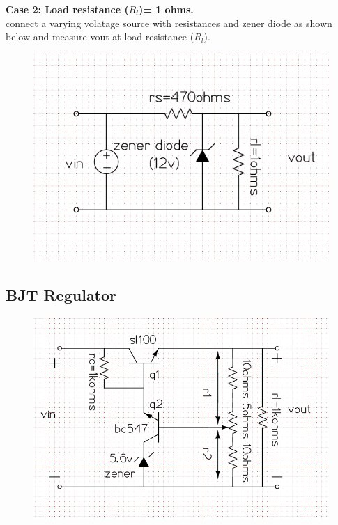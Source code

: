 \documentclass[12pt]{article}
\begin{document}
 \textbf{Case 2: Load resistance (\(R_{l}\))= 1 ohms.\\}
connect a varying volatage source with resistances and zener diode as shown below and measure vout at load resistance (\(R_{l}\)).
 \begin{figure}[h!]
\centering
\includegraphics[scale = 0.4]{zener_1_cir.png}
\end{figure}
 \newpage
 
 \subsection{BJT Regulator}
 
\begin{figure}[h!]
\centering
\includegraphics[scale = 0.4]{BJT_reg_cir.png}
\end{figure}
\end{document}
